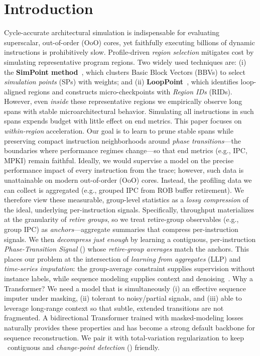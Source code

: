 \section{Introduction}
\label{sec:intro}
Cycle-accurate architectural simulation is indispensable for evaluating superscalar, out-of-order (OoO) cores, yet faithfully executing billions of dynamic instructions is prohibitively slow. Profile-driven \emph{region selection} mitigates cost by simulating representative program regions. Two widely used techniques are: (i) the \textbf{SimPoint method}~\cite{simpoint-asplos02,simpoint03,simpoint-howto}, which clusters Basic Block Vectors (BBVs) to select \emph{simulation points} (SPs) with weights; and (ii) \textbf{LoopPoint}~\cite{looppoint-hpca22}, which identifies loop-aligned regions and constructs micro-checkpoints with \emph{Region IDs} (RIDs). However, even \emph{inside} these representative regions we empirically observe long spans with stable microarchitectural behavior. Simulating all instructions in such spans expends budget with little effect on end metrics.
This paper focuses on \emph{within-region} acceleration. Our  goal is to learn to prune stable spans while preserving compact instruction neighborhoods around \emph{phase transitions}—the boundaries where performance regimes change—so that end metrics (e.g., IPC, MPKI) remain faithful.
Ideally, we would supervise a model on the precise performance impact of every instruction from the trace; however, such data is unattainable on modern out-of-order (OoO) cores. Instead, the profiling data we can collect is aggregated (e.g., grouped IPC from ROB buffer retirement). We therefore view these measurable, group-level statistics as a \emph{lossy compression} of the ideal, underlying per-instruction signals. Specifically, throughput materializes at the granularity of \emph{retire groups}, so we treat retire-group observables (e.g., group IPC) as \emph{anchors}—aggregate summaries that compress per-instruction signals. We then \emph{decompress just enough} by learning a contiguous, per-instruction \emph{Phase-Transition Signal} (\pts) whose \emph{retire-group averages} match the anchors. This places our problem at the intersection of \emph{learning from aggregates} (LLP) and \emph{time-series imputation}: the group-average constraint supplies supervision without instance labels, while sequence modeling supplies context and denoising~\cite{yu2014-llp,scott2020-llp,law2018-agg,zhang2020-agg}.
Why a Transformer? We need a model that is simultaneously (i) an effective sequence imputer under masking, (ii) tolerant to noisy/partial signals, and (iii) able to leverage long-range context so that subtle, extended transitions are not fragmented. A bidirectional Transformer trained with masked-modeling losses naturally provides these properties and has become a strong default backbone for sequence reconstruction. We pair it with total-variation regularization to keep \pts\ contiguous and \emph{change-point detection} (\cpd) friendly.
